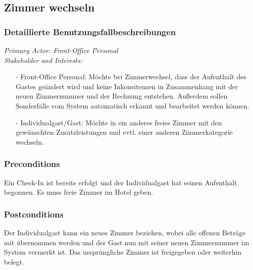 \documentclass[./detailed_overview_usecases.tex]{subfiles}
\begin{document}
    \subsection{Zimmer wechseln}
    \subsubsection{Detaillierte Benutzungsfallbeschreibungen}

    \textit{Primary Actor: Front-Office Personal}
    \\
    \textit{Stakeholder and Interests:}
    \begin{itemize}
        \item[-] Front-Office Personal: Möchte bei Zimmerwechsel, dass der Aufenthalt des Gastes geändert wird und keine Inkonsitenzen in Zusammenhang mit der neuen
        Zimmernummer und der Rechnung entstehen. Außerdem sollen Sonderfälle vom System automatisch erkannt und bearbeitet werden können.
        \item[-] Individualgast/Gast: Möchte in ein anderes freies Zimmer mit den gewünschten Zusatzleistungen und evtl. einer anderen Zimmerkategorie wechseln.
    \end{itemize}

    \subsubsection*{Preconditions}
    Ein Check-In ist bereits erfolgt und der Individualgast hat seinen Aufenthalt begonnen. Es muss freie Zimmer im Hotel geben.

    \subsubsection*{Postconditions}
    Der Individualgast kann ein neues Zimmer beziehen, wobei alle offenen Beträge mit übernommen werden und der Gast nun mit
    seiner neuen Zimmernummer im System vermerkt ist. Das ursprüngliche Zimmer ist freigegeben oder weiterhin belegt.
\end{document}
